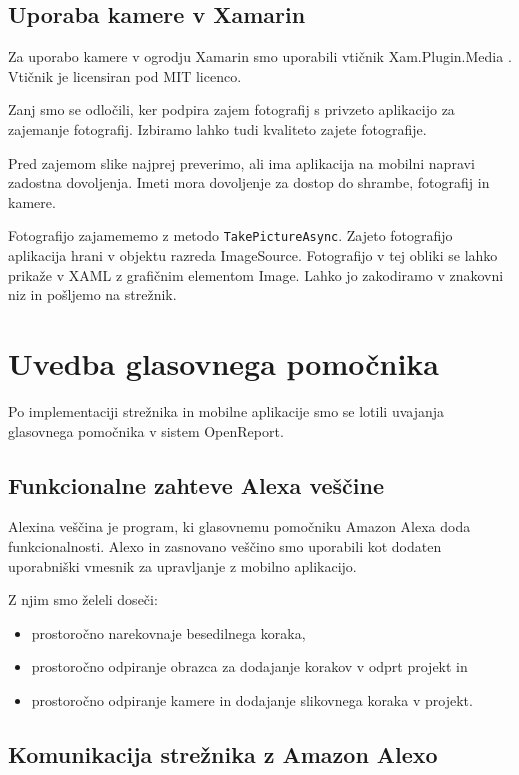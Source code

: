 \documentclass[a4paper, 12pt]{book}
\begin{document}
\subsection{Uporaba kamere v Xamarin}

Za uporabo kamere v ogrodju Xamarin smo uporabili vtičnik Xam.Plugin.Media \cite{xampluginmedia}.
Vtičnik je licensiran pod MIT licenco.

Zanj smo se odločili, ker podpira zajem fotografij s privzeto aplikacijo za zajemanje fotografij.
Izbiramo lahko tudi kvaliteto zajete fotografije.

Pred zajemom slike najprej preverimo, ali ima aplikacija na mobilni napravi zadostna dovoljenja.
Imeti mora dovoljenje za dostop do shrambe, fotografij in kamere.

Fotografijo zajamememo z metodo \texttt{TakePictureAsync}.
Zajeto fotografijo aplikacija hrani v objektu razreda ImageSource.
Fotografijo v tej obliki se lahko prikaže v XAML z grafičnim elementom Image.
Lahko jo zakodiramo v znakovni niz in pošljemo na strežnik.




\section{Uvedba glasovnega pomočnika}

Po implementaciji strežnika in mobilne aplikacije smo se lotili uvajanja glasovnega pomočnika v sistem OpenReport.

\subsection{Funkcionalne zahteve Alexa veščine}

Alexina veščina je program, ki glasovnemu pomočniku Amazon Alexa doda funkcionalnosti.
Alexo in zasnovano veščino smo uporabili kot dodaten uporabniški vmesnik za upravljanje z mobilno aplikacijo.

\noindent Z njim smo želeli doseči:
\begin{itemize}
	\item prostoročno narekovnaje besedilnega koraka,
	\item prostoročno odpiranje obrazca za dodajanje korakov v odprt projekt in
	\item prostoročno odpiranje kamere in dodajanje slikovnega koraka v projekt.
\end{itemize}


\subsection{Komunikacija strežnika z Amazon Alexo}
\end{document}
